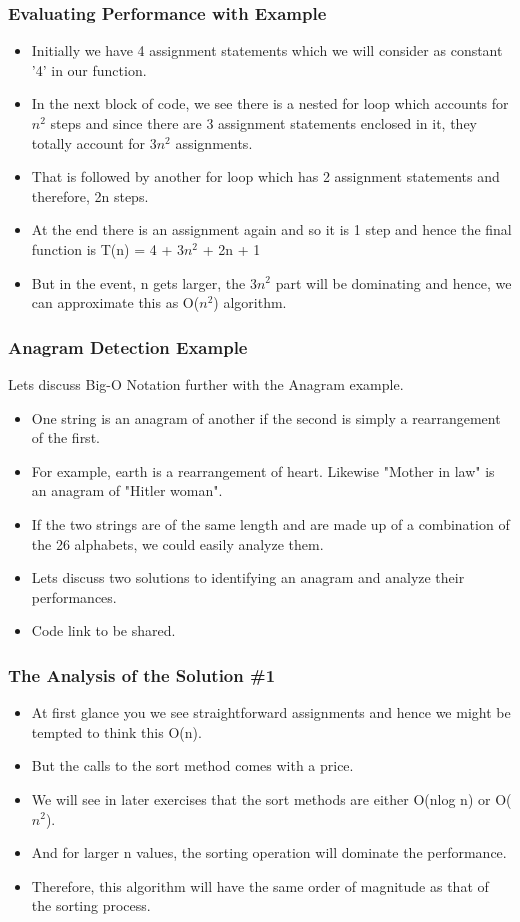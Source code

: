 \documentclass{beamer}
\begin{document}
\begin{frame}[fragile]
\frametitle{Evaluating Performance with Example}
\begin{itemize}
\item Initially we have 4 assignment statements which we will consider as constant '4' in our function.
\item In the next block of code, we see there is a nested for loop which accounts for $n^2$ steps and since there are 3 assignment statements enclosed in it, they totally account for 3$n^2$ assignments.
\item That is followed by another for loop which has 2 assignment statements and therefore, 2n steps.
\item At the end there is an assignment again and so it is 1 step and hence the final function is  
T(n) = 4 + 3$n^2$ + 2n + 1
\item But in the event, n gets larger, the 3$n^2$ part will be dominating and hence, we can approximate this as O($n^2$) algorithm.
\end{itemize}
\end{frame}

\begin{frame}[fragile]
\frametitle{Anagram Detection Example}
Lets discuss Big-O Notation further with the Anagram example.
\begin{itemize}
\item One string is an anagram of another if the second is simply a rearrangement of the first.
\item For example, earth is a rearrangement of heart. Likewise "Mother in law" is an anagram of "Hitler woman".
\item If the two strings are of  the same length and are made up of a combination of the 26 alphabets, we could easily analyze them.
\item Lets discuss two solutions to identifying an anagram and analyze their performances.
\item Code link to be shared.
\end{itemize}
\end{frame}


\begin{frame}
\frametitle{The Analysis of the Solution 
\#1}
\begin{itemize}
\item At first glance you we see straightforward assignments and hence we might be tempted to think this O(n).
\item But the calls to the sort method comes with a price.
\item We will see in later exercises that the sort methods are either O(nlog n) or O($n^2$).
\item And for larger n values, the sorting operation will dominate the performance.
\item Therefore, this algorithm will have the same order of magnitude as that of the sorting process.
\end{itemize}
\end{frame}
\end{document}
